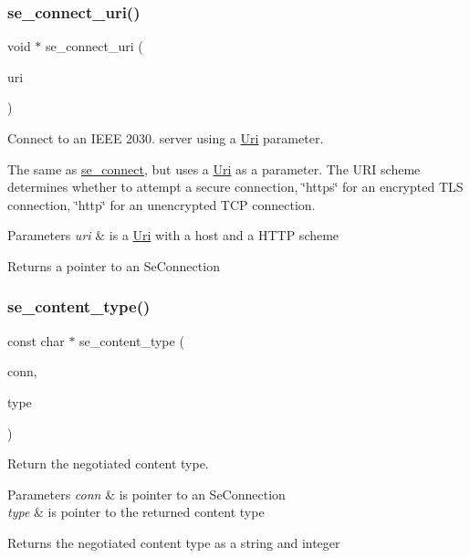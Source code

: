 \subsubsection{\texorpdfstring{se\+\_\+connect\+\_\+uri()}{se\_connect\_uri()}}
{\footnotesize\ttfamily void $\ast$ se\+\_\+connect\+\_\+uri (\begin{DoxyParamCaption}\item[{\hyperlink{structUri}{Uri} $\ast$}]{uri }\end{DoxyParamCaption})}



Connect to an I\+E\+EE 2030. server using a \hyperlink{structUri}{Uri} parameter. 

The same as \hyperlink{group__se__connection_ga46a034b6bbe2211018b10b0eba5d96be}{se\+\_\+connect}, but uses a \hyperlink{structUri}{Uri} as a parameter. The U\+RI scheme determines whether to attempt a secure connection, \char`\"{}https\char`\"{} for an encrypted T\+LS connection, \char`\"{}http\char`\"{} for an unencrypted T\+CP connection. 
\begin{DoxyParams}{Parameters}
{\em uri} & is a \hyperlink{structUri}{Uri} with a host and a H\+T\+TP scheme \\
\hline
\end{DoxyParams}
\begin{DoxyReturn}{Returns}
a pointer to an Se\+Connection 
\end{DoxyReturn}
\mbox{\label{group__se__connection_gadd4baee7388cfb3c1f39a33bbbf9f4b1}} 
\subsubsection{\texorpdfstring{se\+\_\+content\+\_\+type()}{se\_content\_type()}}
{\footnotesize\ttfamily const char $\ast$ se\+\_\+content\+\_\+type (\begin{DoxyParamCaption}\item[{void $\ast$}]{conn,  }\item[{int $\ast$}]{type }\end{DoxyParamCaption})}



Return the negotiated content type. 


\begin{DoxyParams}{Parameters}
{\em conn} & is pointer to an Se\+Connection \\
\hline
{\em type} & is pointer to the returned content type \\
\hline
\end{DoxyParams}
\begin{DoxyReturn}{Returns}
the negotiated content type as a string and integer 
\end{DoxyReturn}
\mbox{\label{group__se__connection_ga4d041c447020f6ba4d310facc21f1776}} 
